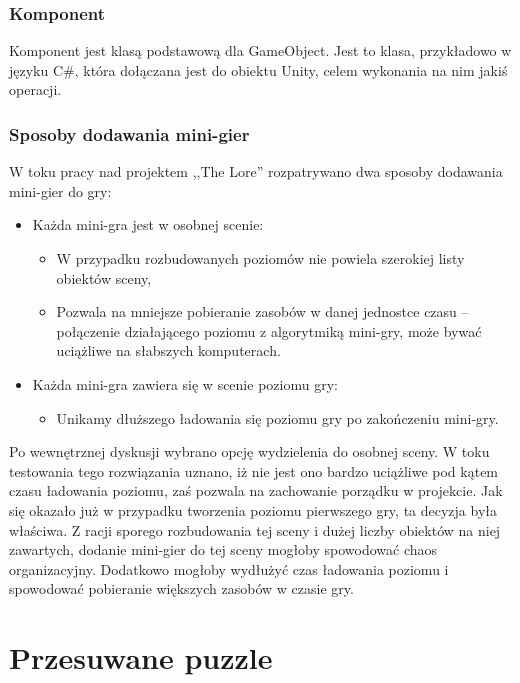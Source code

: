 \documentclass[oneside,polski,logo]{amuthesis}
\begin{document}
\subsubsection{Komponent}
\label{sec:komponent}
\par Komponent jest klasą podstawową dla GameObject. Jest to klasa, przykładowo w języku C\#, która dołączana jest do obiektu Unity, celem wykonania na nim jakiś operacji. \cite{komponent}
\subsubsection{Sposoby dodawania mini-gier}
\par W toku pracy nad projektem ,,The Lore'' rozpatrywano dwa sposoby dodawania mini-gier do gry:
\begin{itemize}
	\item{Każda mini-gra jest w osobnej scenie:}
	\begin{itemize}
		\item W przypadku rozbudowanych poziomów nie powiela szerokiej listy obiektów sceny,
		\item Pozwala na mniejsze pobieranie zasobów w danej jednostce czasu – połączenie działającego poziomu z algorytmiką mini-gry, może bywać uciążliwe na słabszych komputerach.
	\end{itemize}
	\item{Każda mini-gra zawiera się w scenie poziomu gry:}
		\begin{itemize}
		\item Unikamy dłuższego ładowania się poziomu gry po zakończeniu mini-gry.
	\end{itemize}
\end{itemize}

Po wewnętrznej dyskusji wybrano opcję wydzielenia do osobnej sceny. W toku testowania tego rozwiązania uznano, iż nie jest ono bardzo uciążliwe pod kątem czasu ładowania poziomu, zaś pozwala na zachowanie porządku w projekcie. Jak się okazało już w przypadku tworzenia poziomu pierwszego gry, ta decyzja była właściwa. Z racji sporego rozbudowania tej sceny i dużej liczby obiektów na niej zawartych, dodanie mini-gier do tej sceny mogłoby spowodować chaos organizacyjny. Dodatkowo mogłoby wydłużyć czas ładowania poziomu i spowodować pobieranie większych zasobów w czasie gry.

\section{Przesuwane puzzle}
\end{document}
